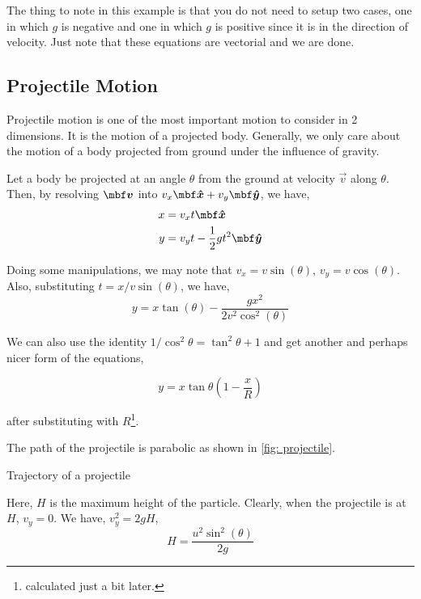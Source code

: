 The thing to note in this example is that you do not need to setup two cases, one in which
\(g\) is negative and one in which \(g\) is positive since it is in the direction of velocity. 
Just note that these equations are vectorial and we are done.


\subsection{Projectile Motion}

Projectile motion is one of the most important motion to consider in 
2 dimensions. It is the motion of a projected body. Generally, we
only care about the motion of a body projected from ground under the influence
of gravity. 

Let a body be projected at an angle \(\theta\) from the ground at velocity \(\vec{v}\)
along \(\theta\). Then, by resolving \(\vv\) into \(v_x \unitv{x} + v_y\unitv{y}\),
we have, 
\begin{align*}
    x &= v_xt \unitv{x} \\
    y &= v_yt - \frac{1}{2}gt^2 \unitv{y}
\end{align*}

Doing some manipulations, we may note that \(v_x = v\sin(\theta)\), \(v_y = v\cos(\theta)\).
Also, substituting \(t = x/v\sin(\theta)\), we have,
\begin{equation}
    \boxed{y = x\tan(\theta) - \frac{gx^2}{2v^2\cos^2(\theta)}}
\end{equation}

We can also use the identity \(1/\cos^2\theta = \tan^2\theta + 1\) and get another and 
perhaps nicer form of the equations,

\begin{equation}
    \boxed{y = x\tan\theta\left(1 - \frac{x}{R}\right)}
\end{equation}

after substituting with \(R\)\footnote{calculated just a bit later.}.

The path of the projectile is parabolic as shown in \cref{fig: projectile}.

\begin{marginfigure}
    \vspace{2em}
    \centering
    \caption{Trajectory of a projectile}
    \label{fig: projectile}
\end{marginfigure}

Here, \(H\) is the maximum height of the particle. Clearly,
when the projectile is at \(H\), \(v_y = 0\). We have, 
\(v_y^2 = 2gH\),
\begin{equation}
    H = \frac{u^2\sin^2(\theta)}{2g}
\end{equation}

